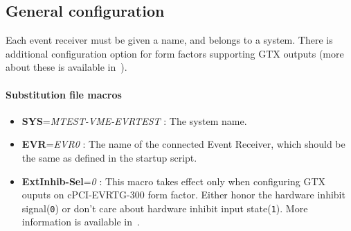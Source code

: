 \documentclass[12pt,a4paper]{article}
\begin{document}

\subsection{General configuration}
Each event receiver must be given a name, and belongs to a system. There is additional configuration option for form factors supporting GTX outputs (more about these is available in~\cite{mrm_evr}).

\paragraph{Substitution file macros}
\begin{itemize}
\item
	\textbf{SYS}=\emph{MTEST-VME-EVRTEST} : The system name. 
\item
	\textbf{EVR}=\emph{EVR0} : The name of the connected Event Receiver, which should be the same as defined in the startup script. 
\item
	\textbf{ExtInhib-Sel}=\emph{0} : This macro takes effect only when
configuring GTX ouputs on cPCI-EVRTG-300 form factor. Either honor
the hardware inhibit signal(\texttt{0}) or don't care about hardware
inhibit input state(\texttt{1}). More information is available in~\cite{mrm_evr}.
\end{itemize}
\end{document}
